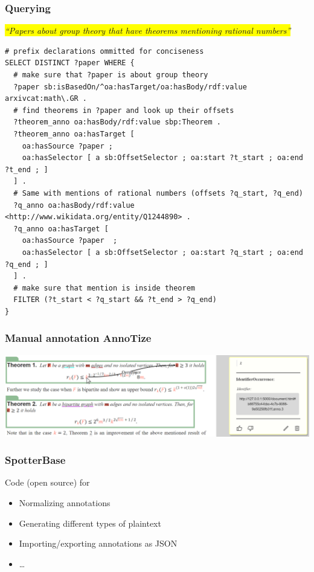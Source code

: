 \documentclass[aspectratio=169]{beamer}
\begin{document}
\begin{frame}[fragile]
    \frametitle{Querying}
    {\centering\itshape
        \colorbox{yellow}{
    ``Papers about group theory that have theorems mentioning rational numbers''
}
    \par}
    \footnotesize
\begin{lstlisting}[language=SPARQL]
# prefix declarations ommitted for conciseness
SELECT DISTINCT ?paper WHERE {
  # make sure that ?paper is about group theory
  ?paper sb:isBasedOn/^oa:hasTarget/oa:hasBody/rdf:value arxivcat:math\.GR .
  # find theorems in ?paper and look up their offsets
  ?theorem_anno oa:hasBody/rdf:value sbp:Theorem .
  ?theorem_anno oa:hasTarget [
    oa:hasSource ?paper ;
    oa:hasSelector [ a sb:OffsetSelector ; oa:start ?t_start ; oa:end ?t_end ; ]
  ] .
  # Same with mentions of rational numbers (offsets ?q_start, ?q_end)
  ?q_anno oa:hasBody/rdf:value <http://www.wikidata.org/entity/Q1244890> .
  ?q_anno oa:hasTarget [
    oa:hasSource ?paper  ;
    oa:hasSelector [ a sb:OffsetSelector ; oa:start ?q_start ; oa:end ?q_end ; ]
  ] .
  # make sure that mention is inside theorem
  FILTER (?t_start < ?q_start && ?t_end > ?q_end)
}
\end{lstlisting}

\end{frame}


\begin{frame}
    \frametitle{Manual annotation AnnoTize}
    \includegraphics[scale=0.5]{workflow_3.png}\par
\end{frame}

\begin{frame}
    \frametitle{SpotterBase}
    Code (open source) for
    \begin{itemize}
        \item Normalizing annotations
        \item Generating different types of plaintext
        \item Importing/exporting annotations as JSON
        \item \ldots
    \end{itemize}
\end{frame}
\end{document}
